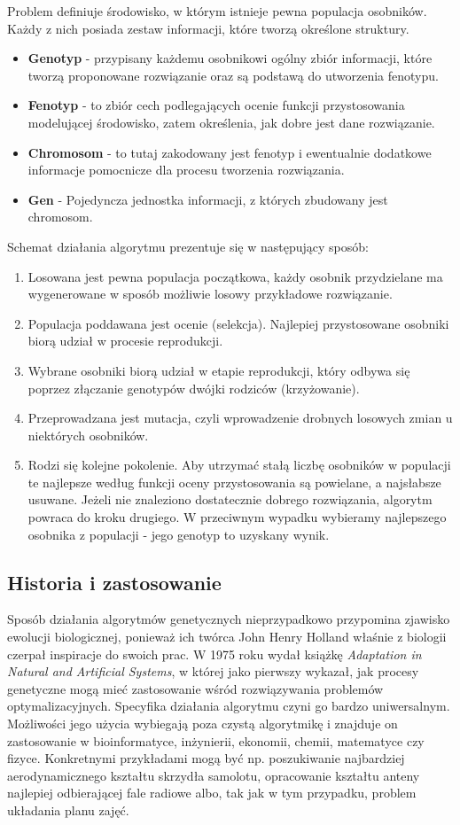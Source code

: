 \par Problem definiuje środowisko, w którym istnieje pewna populacja osobników. Każdy z nich posiada zestaw informacji, które tworzą określone struktury.
\begin {itemize}
\item \textbf{Genotyp} - przypisany każdemu osobnikowi ogólny zbiór informacji, które tworzą proponowane rozwiązanie oraz są podstawą do utworzenia fenotypu.
\item \textbf{Fenotyp} - to zbiór cech podlegających ocenie funkcji przystosowania modelującej środowisko, zatem określenia, jak dobre jest dane rozwiązanie.
\item \textbf{Chromosom} - to tutaj zakodowany jest fenotyp i ewentualnie dodatkowe informacje pomocnicze dla procesu tworzenia rozwiązania.
\item \textbf{Gen} - Pojedyncza jednostka informacji, z których zbudowany jest chromosom.
\end{itemize}
\par Schemat działania algorytmu prezentuje się w następujący sposób:
\begin{enumerate}
\item Losowana jest pewna populacja początkowa, każdy osobnik przydzielane ma wygenerowane w sposób możliwie losowy przykładowe rozwiązanie.
\item Populacja poddawana jest ocenie (selekcja). Najlepiej przystosowane osobniki biorą udział w procesie reprodukcji.
\item Wybrane osobniki biorą udział w etapie reprodukcji, który odbywa się poprzez  złączanie genotypów dwójki rodziców (krzyżowanie).
\item Przeprowadzana jest mutacja, czyli wprowadzenie drobnych losowych zmian u niektórych osobników.
\item Rodzi się kolejne pokolenie. Aby utrzymać stałą liczbę osobników w populacji te najlepsze według funkcji oceny przystosowania są powielane, a najsłabsze usuwane. Jeżeli nie znaleziono dostatecznie dobrego rozwiązania, algorytm powraca do kroku drugiego. W przeciwnym wypadku wybieramy najlepszego osobnika z populacji - jego genotyp to uzyskany wynik.
\end{enumerate}
\subsection{Historia i zastosowanie}
Sposób działania algorytmów genetycznych nieprzypadkowo przypomina zjawisko ewolucji biologicznej, ponieważ ich twórca John Henry Holland właśnie z biologii czerpał inspiracje do swoich prac. W 1975 roku wydał książkę \emph{Adaptation in Natural and Artificial Systems}, w której jako pierwszy wykazał, jak procesy genetyczne mogą mieć zastosowanie wśród rozwiązywania problemów optymalizacyjnych. Specyfika działania algorytmu czyni go bardzo uniwersalnym. Możliwości jego użycia wybiegają poza czystą algorytmikę i znajduje on zastosowanie w bioinformatyce, inżynierii, ekonomii, chemii, matematyce czy fizyce. Konkretnymi przykładami mogą być np. poszukiwanie najbardziej aerodynamicznego kształtu skrzydła samolotu, opracowanie kształtu anteny najlepiej odbierającej fale radiowe albo, tak jak w tym przypadku, problem układania planu zajęć.
